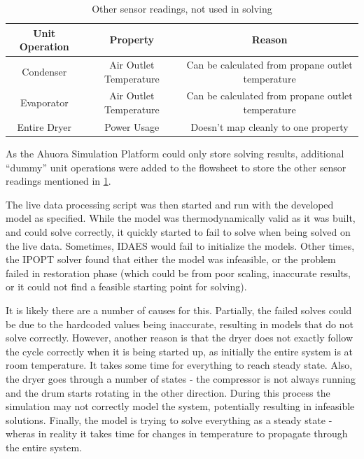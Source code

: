 \begin{table}[htbp]
    \centering
    \caption{Other sensor readings, not used in solving}
    \label{tab:liveprops}
    \begin{tabular}{|c|c|c|}
        \hline
            \textbf{Unit Operation} & \textbf{Property} & \textbf{Reason} \\
            \hline
            Condenser & Air Outlet Temperature & Can be calculated from propane outlet temperature \\
            Evaporator & Air Outlet Temperature & Can be calculated from propane outlet temperature \\
            Entire Dryer & Power Usage & Doesn't map cleanly to one property \\
        \hline
    \end{tabular}
\end{table}

As the Ahuora Simulation Platform could only store solving results, additional ``dummy'' unit operations were added to the flowsheet to store the other sensor readings mentioned in \cref{tab:liveprops}.

The live data processing script was then started and run with the developed model as specified.
While the model was thermodynamically valid as it was built, and could solve correctly, it quickly started to fail to solve when being solved on the live data. 
Sometimes, IDAES would fail to initialize the models. Other times, the IPOPT solver found that either the model was infeasible, or the problem failed in restoration phase (which could be from poor scaling, inaccurate results, or it could not find a feasible starting point for solving).

It is likely there are a number of causes for this. Partially, the failed solves could be due to the hardcoded values being inaccurate, resulting in models that do not solve correctly. However, another reason is that the dryer does not exactly follow the cycle correctly when it is being started up, as initially the entire system is at room temperature. It takes some time for everything to reach steady state. 
Also, the dryer goes through a number of states - the compressor is not always running and the drum starts rotating in the other direction. During this process the simulation may not correctly model the system, potentially resulting in infeasible solutions. 
Finally, the model is trying to solve everything as a steady state - wheras in reality it takes time for changes in temperature to propagate through the entire system. 


